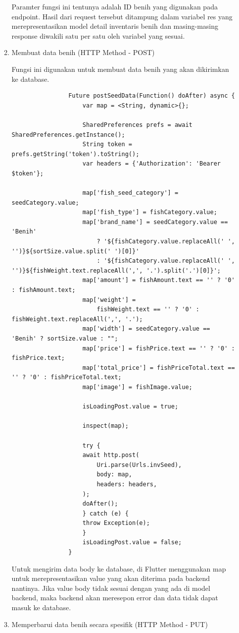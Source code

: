 \begin{spacing}{1.5}
\begin{enumerate}
\begin{enumerate}
			Paramter fungsi ini tentunya adalah ID benih yang digunakan pada endpoint. Hasil dari request tersebut ditampung dalam variabel res yang merepresentasikan model detail inventaris benih dan masing-masing response diwakili satu per satu oleh variabel yang sesuai.

			\item Membuat data benih (HTTP Method - POST)
			
			Fungsi ini digunakan untuk membuat data benih yang akan dikirimkan ke database.

			\begin{lstlisting}
				Future postSeedData(Function() doAfter) async {
					var map = <String, dynamic>{};

					SharedPreferences prefs = await SharedPreferences.getInstance();
					String token = prefs.getString('token').toString();
					var headers = {'Authorization': 'Bearer $token'};

					map['fish_seed_category'] = seedCategory.value;
					map['fish_type'] = fishCategory.value;
					map['brand_name'] = seedCategory.value == 'Benih'
						? '${fishCategory.value.replaceAll(' ', '')}${sortSize.value.split(' ')[0]}'
						: '${fishCategory.value.replaceAll(' ', '')}${fishWeight.text.replaceAll(',', '.').split('.')[0]}';
					map['amount'] = fishAmount.text == '' ? '0' : fishAmount.text;
					map['weight'] =
						fishWeight.text == '' ? '0' : fishWeight.text.replaceAll(',', '.');
					map['width'] = seedCategory.value == 'Benih' ? sortSize.value : "";
					map['price'] = fishPrice.text == '' ? '0' : fishPrice.text;
					map['total_price'] = fishPriceTotal.text == '' ? '0' : fishPriceTotal.text;
					map['image'] = fishImage.value;

					isLoadingPost.value = true;

					inspect(map);

					try {
					await http.post(
						Uri.parse(Urls.invSeed),
						body: map,
						headers: headers,
					);
					doAfter();
					} catch (e) {
					throw Exception(e);
					}
					isLoadingPost.value = false;
				}
			\end{lstlisting}

			Untuk mengirim data body ke database, di Flutter menggunakan map untuk merepresentasikan value yang akan diterima pada backend nantinya. Jika value body tidak sesuai dengan yang ada di model backend, maka backend akan meresepon error dan data tidak dapat masuk ke database.

			\item Memperbarui data benih secara spesifik (HTTP Method - PUT)
			

\end{enumerate}
\end{enumerate}
\end{spacing}
